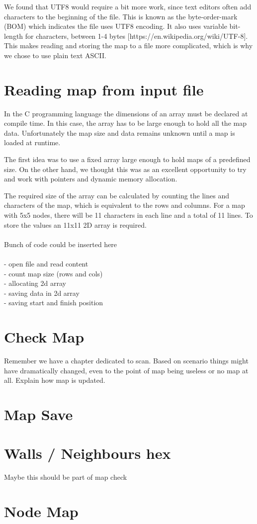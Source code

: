 We found that UTF8 would require a bit more work, since text editors often add characters to the beginning of the file. 
This is known as the byte-order-mark (BOM) which indicates the file uses UTF8 encoding. 
It also uses variable bit-length for characters, between 1-4 bytes [https://en.wikipedia.org/wiki/UTF-8]. 
This makes reading and storing the map to a file more complicated, which is why we chose to use plain text ASCII.

\section{Reading map from input file}
\label{sec:map_read} %
In the C programming language the dimensions of an array must be declared at compile time. 
In this case, the array has to be large enough to hold all the map data. Unfortunately the map size and data remains unknown until a map is loaded at runtime.

The first idea was to use a fixed array large enough to hold maps of a predefined size. 
On the other hand, we thought this was as an excellent opportunity to try and work with pointers and dynamic memory allocation.

The required size of the array can be calculated by counting the lines and characters of the map, which is equivalent to the rows and columns. For a map with 5x5 nodes, there will be 11 characters in each line and a total of 11 lines.
To store the values an 11x11 2D array is required.\\
\\
Bunch of code could be inserted here\\
\\
- open file and read content\\
- count map size (rows and cols)\\
- allocating 2d array\\
- saving data in 2d array\\
- saving start and finish position

\section{Check Map}
\label{sec:map_check} %
Remember we have a chapter dedicated to scan.\linebreak
Based on scenario things might have dramatically changed, 
even to the point of map being useless or no map at all. 
Explain how map is updated.

\section{Map Save}
\label{sec:map_save} %

\section{Walls / Neighbours hex}
\label{sec:map_hex} %
Maybe this should be part of map check

\section{Node Map}
\label{sec:map_node} %



